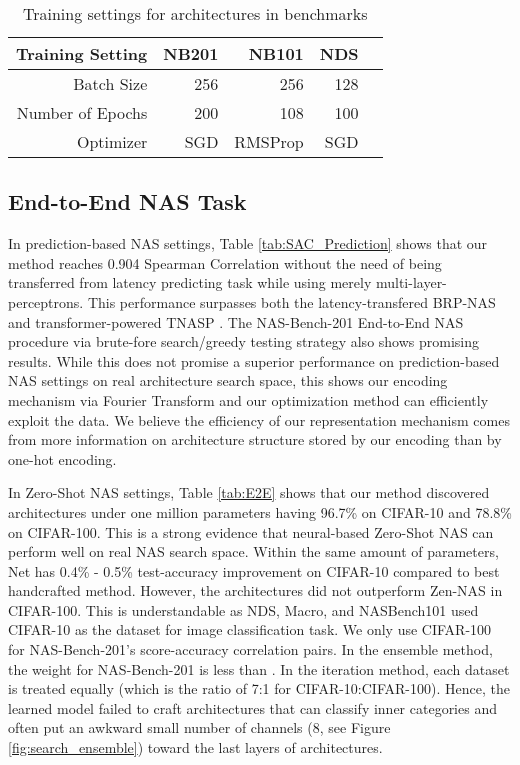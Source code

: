 \documentclass[lettersize,journal]{IEEEtran}
\begin{document}
        \begin{table}
                \caption{Training settings for architectures in benchmarks}
                \centering
                \begin{tabular}{r|rrrr}
                \toprule
                    Training Setting & NB201 & NB101 & NDS\\ 
                    \midrule
                        Batch Size & 256 & 256 & 128 \\ 
                        Number of Epochs & 200 & 108 & 100 \\ 
                        Optimizer & SGD & RMSProp & SGD 
                        \\ 
                    \bottomrule
                    \end{tabular}
                \label{tab:training_settings}
            \end{table}

    \subsection{End-to-End NAS Task}
        In prediction-based NAS settings, Table \ref{tab:SAC_Prediction} shows that our method reaches 0.904 Spearman Correlation without the need of being transferred from latency predicting task while using merely multi-layer-perceptrons. This performance surpasses both the latency-transfered BRP-NAS \cite{BRP-NAS} and transformer-powered TNASP \cite{TNASP}. The NAS-Bench-201 End-to-End NAS procedure via brute-fore search/greedy testing strategy also shows promising results. While this does not promise a superior performance on prediction-based NAS settings on real architecture search space, this shows our encoding mechanism via Fourier Transform and our optimization method can efficiently exploit the data. We believe the efficiency of our representation mechanism comes from more information on architecture structure stored by our encoding than by one-hot encoding.

        In Zero-Shot NAS settings, Table \ref{tab:E2E} shows that our method discovered architectures under one million parameters having 96.7\% on CIFAR-10 and 78.8\% on CIFAR-100. This is a strong evidence that neural-based Zero-Shot NAS can perform well on real NAS search space. Within the same amount of parameters, Net has 0.4\% - 0.5\% test-accuracy improvement on CIFAR-10 compared to best handcrafted method. However, the architectures did not outperform Zen-NAS in CIFAR-100. This is understandable as NDS, Macro, and NASBench101 used CIFAR-10 as the dataset for image classification task. We only use CIFAR-100 for NAS-Bench-201's score-accuracy correlation pairs. In the ensemble method, the weight for NAS-Bench-201 is less than . In the iteration method, each dataset is treated equally (which is the ratio of 7:1 for CIFAR-10:CIFAR-100). Hence, the learned model failed to craft architectures that can classify inner categories and often put an awkward small number of channels (8, see Figure \ref{fig:search_ensemble}) toward the last layers of architectures.
        
\end{document}
